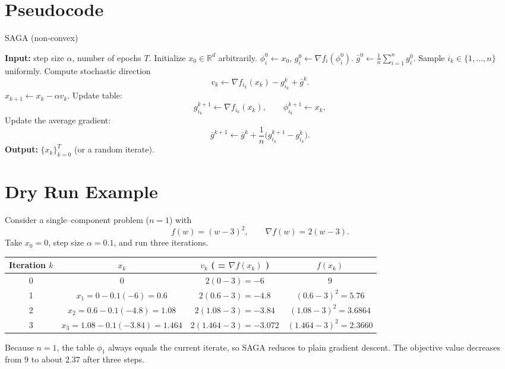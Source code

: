 \documentclass{article}
\newcommand{\RR}{\mathbb{R}}
\begin{document}
\section*{Pseudocode}
\begin{algorithm}[H]
\caption{SAGA (non‑convex)}\label{alg:saga}
\begin{algorithmic}[1]
\State \textbf{Input:} step size $\alpha$, number of epochs $T$.
\State Initialize $x_0\in\RR^{d}$ arbitrarily.
    \State $\phi_i^{0}\gets x_0$,
    \State $g_i^{0}\gets \nabla f_i(\phi_i^{0})$.
\EndFor
\State $\displaystyle \bar g^{0}\gets \frac1n\sum_{i=1}^{n} g_i^{0}$.
    \State Sample $i_k\in\{1,\dots,n\}$ uniformly.
    \State Compute stochastic direction 
    \[
    v_k \gets \nabla f_{i_k}(x_k)-g_{i_k}^{k}+\bar g^{k}.
    \]
    \State $x_{k+1}\gets x_k-\alpha v_k$.
    \State Update table:
    \[
    g_{i_k}^{k+1}\gets \nabla f_{i_k}(x_k),\qquad 
    \phi_{i_k}^{k+1}\gets x_k,
    \]
    \State Update the average gradient:
    \[
    \bar g^{k+1}\gets \bar g^{k}+ \frac{1}{n}\bigl(g_{i_k}^{k+1}-g_{i_k}^{k}\bigr).
    \]
\EndFor
\State \textbf{Output:} $\{x_k\}_{k=0}^{T}$ (or a random iterate).
\end{algorithmic}
\end{algorithm}

\section*{Dry Run Example}
Consider a single–component problem ($n=1$) with
\[
f(w) = (w-3)^2,\qquad \nabla f(w)=2(w-3).
\]
Take $x_0=0$, step size $\alpha=0.1$, and run three iterations.

\begin{center}
\begin{tabular}{c|c|c|c}
Iteration $k$ & $x_k$ & $v_k$ ( = $\nabla f(x_k)$ ) & $f(x_k)$\\ \hline
0 & $0$ & $2(0-3)=-6$ & $9$\\
1 & $x_1=0-0.1(-6)=0.6$ & $2(0.6-3)=-4.8$ & $(0.6-3)^2=5.76$\\
2 & $x_2=0.6-0.1(-4.8)=1.08$ & $2(1.08-3)=-3.84$ & $(1.08-3)^2=3.6864$\\
3 & $x_3=1.08-0.1(-3.84)=1.464$ & $2(1.464-3)=-3.072$ & $(1.464-3)^2=2.3660$\\
\end{tabular}
\end{center}
Because $n=1$, the table $\phi_1$ always equals the current iterate, so SAGA reduces to plain gradient descent. The objective value decreases from $9$ to about $2.37$ after three steps.
\end{document}
